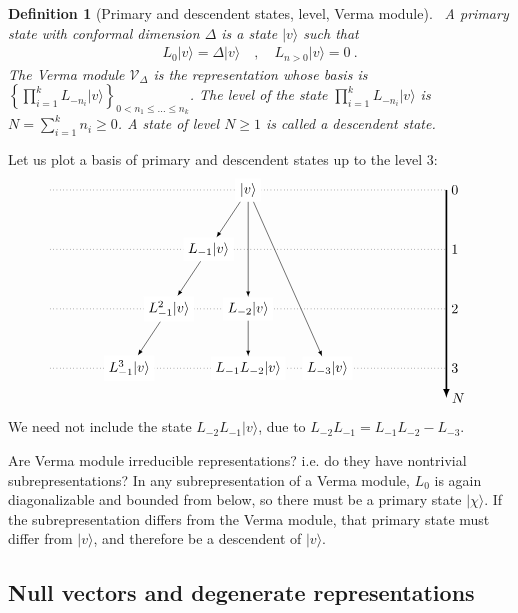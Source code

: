 \documentclass[12pt, a4paper]{article}
\theoremstyle{break}
\newtheorem{defn}[exo]{Definition}
\begin{document}
\begin{defn}[Primary and descendent states, level, Verma module]
 ~\label{def:prim}
 A primary state with conformal dimension $\Delta$ is a state $|v\rangle$ such that 
 \begin{align}
  L_0 |v\rangle = \Delta |v\rangle \quad , \quad L_{n>0} |v\rangle = 0\ .
 \end{align}
The Verma module $\mathcal V_\Delta$ is the representation whose basis is 
 $
 \left\{ \prod_{i=1}^k L_{-n_i} |v\rangle\right\}_{ 0<n_1\leq \dots \leq n_k}
 $.
The level of the state $\prod_{i=1}^k L_{-n_i} |v\rangle $ is $N=\sum_{i=1}^k n_i\geq 0$. A state of level $N\geq 1$ is called a descendent state.
\end{defn}
Let us plot a basis of primary and descendent states up to the level $3$:
\begin{align}
 \begin{tikzpicture}[scale = .25, baseline=(current  bounding  box.center)]
  \draw[-latex, very thick] (20, 0) -- (20, -21) node [right] {$N$};
  \foreach \x in {0, ..., 3}
  {
  \draw [dotted] (-20, {-6*\x}) -- (20, {-6*\x}) node [right] {${\x}$};
  }
  \node[fill = white] at (0, 0) (0) {$|v\rangle$};
  \node[fill = white] at (-4,-6) (1) {$L_{-1}|v\rangle$};
  \node[fill = white] at (-8, -12) (11) {$L_{-1}^2|v\rangle$};
  \node[fill = white] at (-12, -18) (111) {$L_{-1}^3|v\rangle$};
  \node[fill = white] at (0,-12) (2) {$L_{-2}|v\rangle$};
  \node[fill = white] at (0,-18) (12) {$L_{-1}L_{-2}|v\rangle$};
  \node[fill = white] at (8,-18) (3) {$L_{-3}|v\rangle$};
  \draw[-latex] (0) -- (1);
  \draw[-latex] (1) -- (11);
  \draw[-latex] (11) -- (111);
  \draw[-latex] (0) -- (2);
  \draw[-latex] (0) -- (3);
  \draw[-latex] (2) -- (12);
 \end{tikzpicture}
\end{align}
We need not include the state $L_{-2}L_{-1}|v\rangle$, due to $L_{-2}L_{-1} = L_{-1}L_{-2} - L_{-3}$.

Are Verma module irreducible representations? i.e. do they have nontrivial subrepresentations? In any subrepresentation of a Verma module, $L_0$ is again diagonalizable and bounded from below, so there must be a primary state $|\chi\rangle$. If the subrepresentation differs from the Verma module, that primary state must differ from $|v\rangle$, and therefore be a descendent of $|v\rangle$.

\subsection{Null vectors and degenerate representations}\label{sec:nv}
\end{document}
